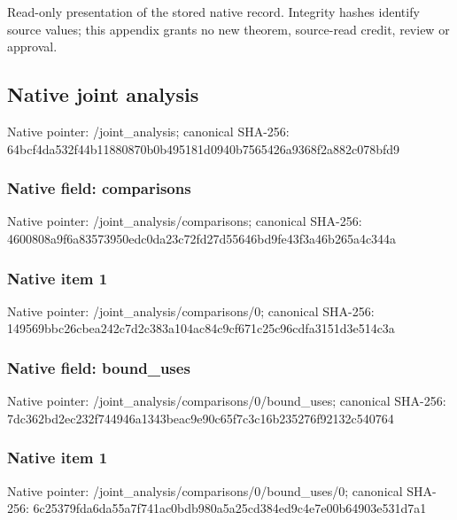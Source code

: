\documentclass[10pt,a4paper]{article}
\begin{document}
Read-only presentation of the stored native record. Integrity hashes identify source values; this appendix grants no new theorem, source-read credit, review or approval.



\subsection{Native joint analysis}


Native pointer: /joint\_analysis; canonical SHA-256: 64bcf4da532f44b11880870b\allowbreak{}0b495181d0940b7565426a93\allowbreak{}68f2a882c078bfd9



\subsubsection{Native field: comparisons}


Native pointer: /joint\_analysis/comparisons; canonical SHA-256: 4600808a9f6a83573950edc0\allowbreak{}da23c72fd27d55646bd9fe43\allowbreak{}f3a46b265a4c344a



\subsubsection{Native item 1}


Native pointer: /joint\_analysis/comparisons/0; canonical SHA-256: 149569bbc26cbea242c7d2c3\allowbreak{}83a104ac84c9cf671c25c96c\allowbreak{}dfa3151d3e514c3a



\subsubsection{Native field: bound\_uses}


Native pointer: /joint\_analysis/comparis\allowbreak{}ons/0/bound\_uses; canonical SHA-256: 7dc362bd2ec232f744946a13\allowbreak{}43beac9e90c65f7c3c16b235\allowbreak{}276f92132c540764



\subsubsection{Native item 1}


Native pointer: /joint\_analysis/comparis\allowbreak{}ons/0/bound\_uses/0; canonical SHA-256: 6c25379fda6da55a7f741ac0\allowbreak{}bdb980a5a25cd384ed9c4e7e\allowbreak{}00b64903e531d7a1
\end{document}
